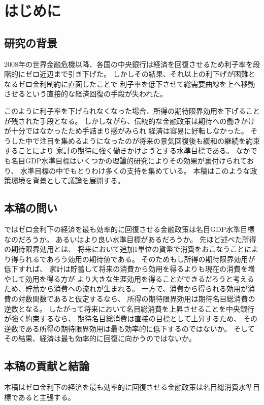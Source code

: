 
\chapter{はじめに}
\label{chap:chapter1}

\section{研究の背景}
\label{sec:chapter1_background}
2008年の世界金融危機以降、各国の中央銀行は経済を回復させるため利子率を段階的にゼロ近辺まで引き下げた。
しかしその結果、それ以上の利下げが困難となるゼロ金利制約に直面したことで
利子率を低下させて総需要曲線を上へ移動させるという直接的な経済回復の手段が失われた。

このように利子率を下げられなくなった場合、所得の期待限界効用を下げることが残された手段となる。
しかしながら、伝統的な金融政策は期待への働きかけが十分ではなかったため手詰まり感がみられ
経済は容易に好転しなかった。
そうした中で注目を集めるようになったのが将来の景気回復後も緩和の継続を約束することにより
家計の期待に強く働きかけようとする水準目標である。
なかでも名目GDP水準目標はいくつかの理論的研究によりその効果が裏付けられており、
水準目標の中でもとりわけ多くの支持を集めている。
本稿はこのような政策環境を背景として議論を展開する。

\section{本稿の問い}
\label{sec:chapter1_question}
ではゼロ金利下の経済を最も効率的に回復させる金融政策は名目GDP水準目標なのだろうか。
あるいはより良い水準目標があるだろうか。
先ほど述べた所得の期待限界効用とは、
将来において追加1単位の貨幣で消費をおこなうことにより得られるであろう効用の期待値である。
そのためもし所得の期待限界効用が低下すれば、
家計は貯蓄して将来の消費から効用を得るよりも現在の消費を増やして効用を得る方が
より大きな生涯効用を得ることができるだろうと考えるため、貯蓄から消費への流れが生まれる。
一方で、消費から得られる効用が消費の対数関数であると仮定するなら、
所得の期待限界効用は期待名目総消費の逆数となる。
したがって将来において名目総消費を上昇させることを中央銀行が強く約束するなら、
期待名目総消費は直接の目標として上昇するため、
その逆数である所得の期待限界効用は最も効率的に低下するのではないか。
そしてその結果、経済は最も効率的に回復に向かうのではないか。

\section{本稿の貢献と結論}
\label{sec:chapter1_contribution}
本稿はゼロ金利下の経済を最も効率的に回復させる金融政策は名目総消費水準目標であると主張する。

